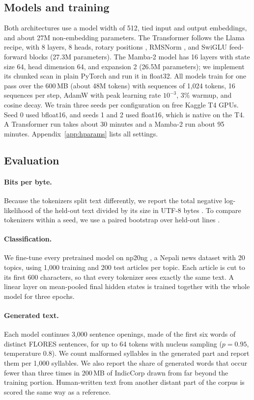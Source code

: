 \documentclass[11pt]{article}
\begin{document}
\subsection{Models and training}
Both architectures use a model width of 512, tied input and output embeddings, and about 27M non-embedding parameters. The Transformer \citep{vaswani2017attention} follows the Llama recipe, with 8 layers, 8 heads, rotary positions \citep{su2024roformer}, RMSNorm \citep{zhang2019rmsnorm}, and SwiGLU feed-forward blocks \citep{shazeer2020glu} (27.3M parameters). The Mamba-2 model \citep{gu2023mamba,dao2024transformers} has 16 layers with state size 64, head dimension 64, and expansion 2 (26.5M parameters); we implement its chunked scan in plain PyTorch and run it in float32. All models train for one pass over the 600\,MB (about 48M tokens) with sequences of 1,024 tokens, 16 sequences per step, AdamW \citep{loshchilov2019adamw} with peak learning rate $10^{-3}$, 3\% warmup, and cosine decay. We train three seeds per configuration on free Kaggle T4 GPUs. Seed 0 used bfloat16, and seeds 1 and 2 used float16, which is native on the T4. A Transformer run takes about 30 minutes and a Mamba-2 run about 95 minutes. Appendix~\ref{app:hparams} lists all settings.


\subsection{Evaluation}
\paragraph{Bits per byte.} Because the tokenizers split text differently, we report the total negative log-likelihood of the held-out text divided by its size in UTF-8 bytes \citep{gao2020pile}. To compare tokenizers within a seed, we use a paired bootstrap over held-out lines \citep{koehn-2004-statistical}.

\paragraph{Classification.} We fine-tune every pretrained model on np20ng \citep{np20ng}, a Nepali news dataset with 20 topics, using 1,000 training and 200 test articles per topic. Each article is cut to its first 600 characters, so that every tokenizer sees exactly the same text. A linear layer on mean-pooled final hidden states is trained together with the whole model for three epochs.

\paragraph{Generated text.} Each model continues 3,000 sentence openings, made of the first six words of distinct FLORES sentences, for up to 64 tokens with nucleus sampling \citep{holtzman2020curious} ($p=0.95$, temperature 0.8). We count malformed syllables in the generated part and report them per 1,000 syllables. We also report the share of generated words that occur fewer than three times in 200\,MB of IndicCorp drawn from far beyond the training portion. Human-written text from another distant part of the corpus is scored the same way as a reference.
\end{document}
